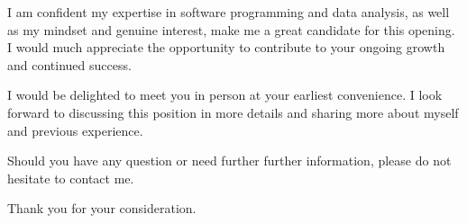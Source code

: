\documentclass[11pt, a4paper]{\TEXPATH awesome-cv}
\begin{document}
\begin{cvletter}
  I am confident my expertise in software programming and data analysis, as well
  as my mindset and genuine interest, make me a great candidate for this
  opening. I would much appreciate the opportunity to contribute to your
  ongoing growth and continued success.

  I would be delighted to meet you in person at your earliest convenience.
  I look forward to discussing this position in more details and sharing more
  about myself and previous experience.

  Should you have any question or need further further information, please do
  not hesitate to contact me.

  Thank you for your consideration.
  
\end{cvletter}
 

\makeletterclosing %
\end{document}
